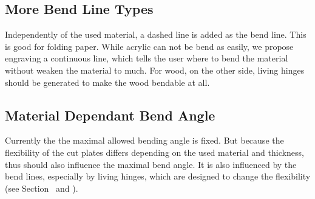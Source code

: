 \documentclass[../ClassicThesis.tex]{subfiles}
\begin{document}
\subsection{More Bend Line Types}
\label{sec:more_bend_line_types}

 Independently of the used material, a dashed line is added as the bend line. This is good for folding paper. While acrylic can not be bend as easily, we propose engraving a continuous line, which tells the user where to bend the material without weaken the material to much. For wood, on the other side, living hinges should be generated to make the wood bendable at all.

\subsection{Material Dependant Bend Angle}
\label{sec:material_dependant_bend_angle}

Currently the the maximal allowed bending angle is fixed. But because the flexibility of the cut plates differs depending on the used material and thickness, thus should also influence the maximal bend angle. It is also influenced by the bend lines, especially by living hinges, which are designed to change the flexibility (see Section~ and ).
\end{document}
